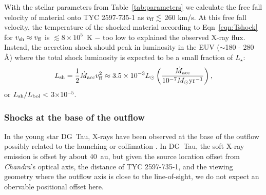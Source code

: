 \documentclass[linenumbers]{aastex631}
\begin{document}
With the stellar parameters from Table~\ref{tab:parameters} we calculate the free fall velocity of material onto TYC 2597-735-1 as
$v_{\rm ff} \lesssim$ 260 km/s. At this free fall velocity, the temperature of the shocked material according to Eqn~\ref{eqn:Tshock} for $v_{\rm sh} \approx v_{\rm ff}$ is $\lesssim8\times 10^5$~K $-$ too low to explained the observed X-ray flux.
Instead, the accretion shock should peak in luminosity in the EUV ($\sim$180 - 280 {\AA}) where the total shock luminosity is expected to be a small fraction of $L_{\star}$:
\begin{equation}
    L_{\rm sh} = \frac{1}{2} \dot{M}_{\rm acc} v_{\rm ff}^{2} \approx 3.5 \times 10^{-3} L_{\odot}\left(\frac{\dot{M}_{\rm acc}}{10^{-7}M_{\odot}{\rm yr^{-1}}}\right),
\end{equation}
or $L_{\rm sh}/L_{\rm bol} <$ 3$\times$10$^{-5}$.

\subsubsection{Shocks at the base of the outflow}
In the young star DG~Tau, X-rays have been observed at the base of the outflow \citep{2008A&A...488L..13S} possibly related to the launching or collimation \citep[e.g.][]{2014ApJ...795...51G,2018A&A...615A.124U}. In DG~Tau, the soft X-ray emission is offset by about 40~au, but given the source location offset from \emph{Chandra}'s optical axis, the distance of TYC 2597-735-1, and the viewing geometry where the outflow axis is close to the line-of-sight, we do not expect an obervable positional offset here.
\end{document}
